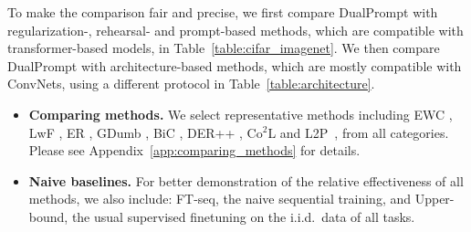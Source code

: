 \documentclass[runningheads]{llncs}
\newcommand{\sayna}[1]{\textcolor{blue}{Sayna: #1}}
\newcommand{\zizhaoz}[1]{\textcolor{green}{Zizhao: #1}}
\newcommand{\method}{DualPrompt\xspace}
\begin{document}
To make the comparison fair and precise, we first compare \method with regularization-, rehearsal- and prompt-based methods, which are compatible with transformer-based models, in Table~\ref{table:cifar_imagenet}. We then compare \method with architecture-based methods, which are mostly compatible with ConvNets, using a different protocol in Table~\ref{table:architecture}. 

\begin{itemize}
\item \textbf{Comparing methods.} We select representative methods including \textsf{EWC} \cite{kirkpatrick2017overcoming}, \textsf{LwF} \cite{li2017learning}, \textsf{ER} \cite{chaudhry2019tiny,hayes2019memory}, \textsf{GDumb} \cite{prabhu2020gdumb}, \textsf{BiC} \cite{wu2019large}, \textsf{DER++} \cite{buzzega2020dark}, \textsf{Co$^2$L} \cite{cha2021co2l} and \textsf{L2P}~\cite{wang2021learning}, from all categories. Please see Appendix~\ref{app:comparing_methods} for details.
    
    \item \textbf{Naive baselines.} For better demonstration of the relative effectiveness of all methods, we also include: \textsf{FT-seq}, the naive sequential training, and \textsf{Upper-bound}, the usual supervised finetuning on the i.i.d.~data of all tasks.
\end{itemize}


\end{document}
